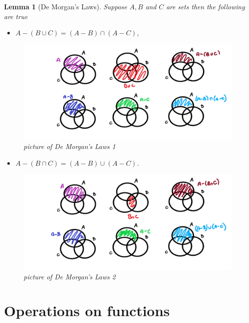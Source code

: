 \documentclass[
]{book}
\providecommand{\tightlist}{%
  \setlength{\itemsep}{0pt}\setlength{\parskip}{0pt}}
\newtheorem{lemma}{Lemma}[chapter]
\theoremstyle{definition}
\theoremstyle{definition}
\theoremstyle{definition}
\theoremstyle{definition}
\theoremstyle{remark}
\begin{document}
\begin{lemma}[De Morgan's Laws]

Suppose \(A, B\) and \(C\) are sets then the following are true

\begin{itemize}
\tightlist
\item
  \(A - (B \cup C) = (A-B)\cap(A-C)\),
\end{itemize}

\begin{figure}
\centering
\includegraphics{demorgan1.png}
\caption{\label{fig:unnamed-chunk-15}picture of De Morgan's Laws 1}
\end{figure}

\begin{itemize}
\tightlist
\item
  \(A - (B \cap C) = (A-B)\cup(A-C)\).
\end{itemize}

\begin{figure}
\centering
\includegraphics{demorgan2.png}
\caption{\label{fig:unnamed-chunk-16}picture of De Morgan's Laws 2}
\end{figure}

\end{lemma}

\section{Operations on functions}\label{operations-on-functions}
\end{document}
